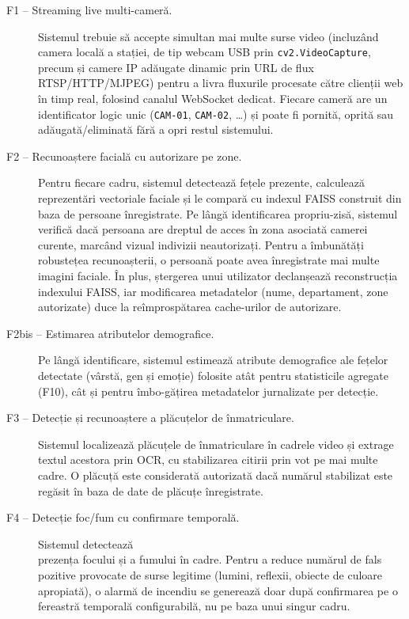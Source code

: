 \documentclass[../../main.tex]{subfiles}
\begin{document}
\begin{description}
	\item[F1 -- Streaming live multi-cameră.] Sistemul trebuie să accepte simultan mai multe surse video (incluzând camera locală a stației, de tip webcam USB prin \texttt{cv2.VideoCapture}, precum și camere IP adăugate dinamic prin URL de flux RTSP/HTTP/MJPEG) pentru a livra fluxurile procesate către clienții web în timp real, folosind canalul WebSocket dedicat. Fiecare cameră are un identificator logic unic (\texttt{CAM-01}, \texttt{CAM-02}, \dots) și poate fi pornită, oprită sau adăugată/eliminată fără a opri restul sistemului.

	\item[F2 -- Recunoaștere facială cu autorizare pe zone.] Pentru fiecare cadru, sistemul detectează fețele prezente, calculează reprezentări vectoriale faciale și le compară cu indexul FAISS construit din baza de persoane înregistrate. Pe lângă identificarea propriu-zisă, sistemul verifică dacă persoana are dreptul de acces în zona asociată camerei curente, marcând vizual indivizii neautorizați. Pentru a îmbunătăți robustețea recunoașterii, o persoană poate avea înregistrate mai multe imagini faciale. În plus, ștergerea unui utilizator declanșează reconstrucția indexului FAISS, iar modificarea metadatelor (nume, departament, zone autorizate) duce la reîmprospătarea cache-urilor de autorizare.

    \item[F2bis -- Estimarea atributelor demografice.] Pe lângă identificare, sistemul estimează atribute demografice ale fețelor detectate (vârstă, gen și emoție) folosite atât pentru statisticile agregate (F10), cât și pentru îmbo-gățirea metadatelor jurnalizate per detecție.

    \item[F3 -- Detecție și recunoaștere a plăcuțelor de înmatriculare.] Sistemul \linebreak localizează plăcuțele de înmatriculare în cadrele video și extrage textul acestora prin OCR, cu stabilizarea citirii prin vot pe mai multe cadre. O plăcuță este considerată autorizată dacă numărul stabilizat este regăsit în baza de date de plăcuțe înregistrate.

    \item[F4 -- Detecție foc/fum cu confirmare temporală.] Sistemul detectează\\ prezența focului și a fumului în cadre. Pentru a reduce numărul de fals pozitive provocate de surse legitime (lumini, reflexii, obiecte de culoare apropiată), o alarmă de incendiu se generează doar după confirmarea pe o fereastră temporală configurabilă, nu pe baza unui singur cadru.


\end{description}
\end{document}
